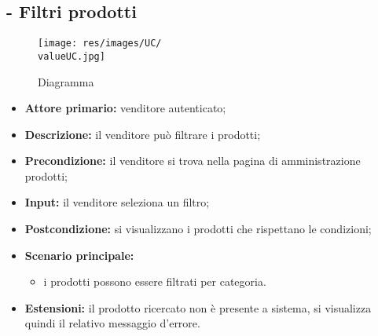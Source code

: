 \subsection{- Filtri prodotti}
\begin{figure}[H]
    \centering
    \texttt{[image: res/images/UC/\\valueUC.jpg]}
    \caption{Diagramma }
\end{figure}
\begin{itemize}
    \item \textbf{Attore primario:} venditore autenticato;
    \item \textbf{Descrizione:} il venditore può filtrare i prodotti;
    \item \textbf{Precondizione:} il venditore si trova nella pagina di amministrazione prodotti;
    \item \textbf{Input:} il venditore seleziona un filtro;
    \item \textbf{Postcondizione:} si visualizzano i prodotti che rispettano le condizioni;
    \item \textbf{Scenario principale:}
    \begin{itemize}
        \item i prodotti possono essere filtrati per categoria.
    \end{itemize}
    \item \textbf{Estensioni:} il prodotto ricercato non è presente a sistema, si visualizza quindi il relativo messaggio d'errore.
\end{itemize}

\stepUserCase

